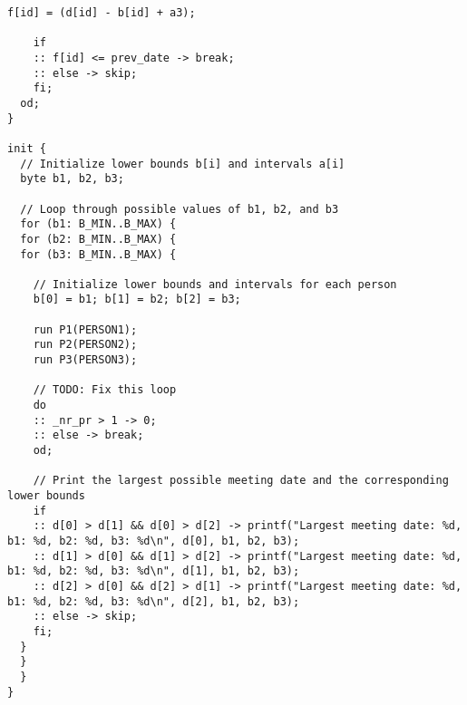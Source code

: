 \begin{lstlisting}[language=Promela]
    f[id] = (d[id] - b[id] + a3);
    
    if
    :: f[id] <= prev_date -> break;
    :: else -> skip;
    fi;
  od;
}

init {
  // Initialize lower bounds b[i] and intervals a[i]
  byte b1, b2, b3;
  
  // Loop through possible values of b1, b2, and b3
  for (b1: B_MIN..B_MAX) {
  for (b2: B_MIN..B_MAX) {
  for (b3: B_MIN..B_MAX) {
  
    // Initialize lower bounds and intervals for each person
    b[0] = b1; b[1] = b2; b[2] = b3;
  
    run P1(PERSON1);
	run P2(PERSON2); 
	run P3(PERSON3);
  
    // TODO: Fix this loop
    do
    :: _nr_pr > 1 -> 0;
    :: else -> break;
    od;
  
    // Print the largest possible meeting date and the corresponding lower bounds
    if
    :: d[0] > d[1] && d[0] > d[2] -> printf("Largest meeting date: %d, b1: %d, b2: %d, b3: %d\n", d[0], b1, b2, b3);
    :: d[1] > d[0] && d[1] > d[2] -> printf("Largest meeting date: %d, b1: %d, b2: %d, b3: %d\n", d[1], b1, b2, b3);
    :: d[2] > d[0] && d[2] > d[1] -> printf("Largest meeting date: %d, b1: %d, b2: %d, b3: %d\n", d[2], b1, b2, b3);
    :: else -> skip;
    fi;
  }
  }
  }
}


\end{lstlisting}
